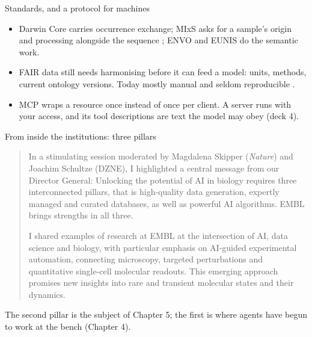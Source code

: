 \documentclass[11pt,aspectratio=169]{beamer}
\begin{document}
\begin{frame}{Standards, and a protocol for machines}
  \small
  \begin{itemize}
    \item Darwin Core carries occurrence exchange; MIxS asks for a sample's
      origin and processing alongside the sequence
      \parencite{wieczorek2012darwincore}; ENVO and EUNIS do the semantic work.
    \item FAIR data still needs harmonising before it can feed a model: units,
      methods, current ontology versions. Today mostly manual and seldom
      reproducible \parencite{woodcharlson2026cope}.
    \item MCP wraps a resource once instead of once per client. A server runs
      with your access, and its tool descriptions are text the model may obey
      (deck 4).
  \end{itemize}
\end{frame}

\begin{frame}{From inside the institutions: three pillars}
  \small
  \begin{quote}
    In a stimulating session moderated by Magdalena Skipper (\emph{Nature})
    and Joachim Schultze (DZNE), I highlighted a central message from our
    Director General: Unlocking the potential of AI in biology requires three
    interconnected pillars, that is high-quality data generation, expertly
    managed and curated databases, as well as powerful AI algorithms. EMBL
    brings strengths in all three.

    I shared examples of research at EMBL at the intersection of AI, data
    science and biology, with particular emphasis on AI-guided experimental
    automation, connecting microscopy, targeted perturbations and quantitative
    single-cell molecular readouts. This emerging approach promises new
    insights into rare and transient molecular states and their dynamics.
  \end{quote}
  The second pillar is the subject of Chapter 5; the first is where agents
  have begun to work at the bench (Chapter 4).
\end{frame}
\end{document}
